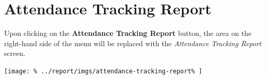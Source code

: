 \documentclass[../main/main]{subfiles}
\begin{document}
\newpage
\section{Attendance Tracking Report}
\label{sec:attendance-tracking-report}

Upon clicking on the \textbf{Attendance Tracking Report} button,
the area on the right-hand side of the menu will be replaced with the
\emph{Attendance Tracking Report} screen.

\texttt{[image: \%
  ../report/imgs/attendance-tracking-report\%
]}
\end{document}
